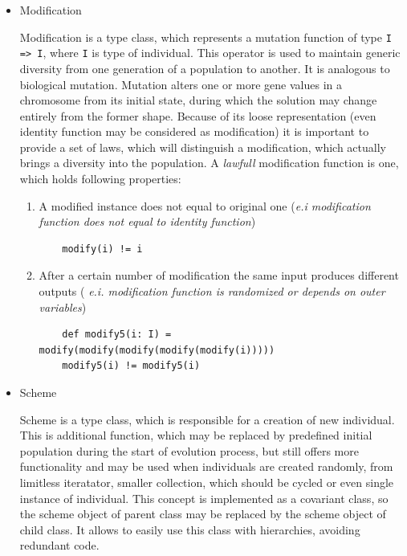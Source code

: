 \begin{itemize}
\begin{itemize}
\item
Modification

Modification is a type class, which represents a mutation function of type \texttt{I => I}, where \texttt{I} is type of individual. This operator is used to maintain generic diversity from one generation of a population to another. It is analogous to biological mutation. Mutation alters one or more gene values in a chromosome from its initial state, during which the solution may change entirely from the former shape. Because of its loose representation (even identity function may be considered as modification) it is important to provide a set of laws, which will distinguish a modification, which actually brings a diversity into the population. A \textit{lawfull} modification function is one, which holds following properties:

\begin{enumerate}
\item
A modified instance does not equal to original one (\textit{e.i modification function does not equal to identity function})

\begin{listing}
\begin{verbatim}
	modify(i) != i
\end{verbatim}
\end{listing}

\item
After a certain number of modification the same input produces different outputs (\textit{ e.i. modification function is randomized or depends on outer variables})

\begin{listing}
\begin{verbatim}
	def modify5(i: I) = modify(modify(modify(modify(modify(i)))))
	modify5(i) != modify5(i)
\end{verbatim}
\end{listing}


\end{enumerate}
\medbreak

\item
Scheme

Scheme is a type class, which is responsible for a creation of new individual. This is additional function, which may be replaced by predefined initial population during the start of evolution process, but still offers more functionality and may be used when individuals are created randomly, from limitless iteratator, smaller collection, which should be cycled or even single instance of individual. This concept is implemented as a covariant class, so the scheme object of parent class may be replaced by the scheme object of child class. It allows to easily use this class with hierarchies, avoiding redundant code. 
\end{itemize} 
\medbreak


\end{itemize}
